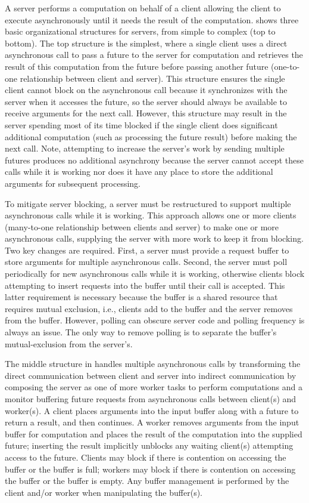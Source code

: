 \documentclass[openright,twoside]{report}
\begin{document}
A server performs a computation on behalf of a client allowing the client to execute asynchronously until it needs the result of the computation.
 shows three basic organizational structures for servers, from simple to complex (top to bottom).
The top structure is the simplest, where a single client uses a direct asynchronous call to pass a future to the server for computation and retrieves the result of this computation from the future before passing another future (one-to-one relationship between client and server).
This structure ensures the single client cannot block on the asynchronous call because it synchronizes with the server when it accesses the future, so the server should always be available to receive arguments for the next call.
However, this structure may result in the server spending most of its time blocked if the single client does significant additional computation (such as processing the future result) before making the next call.
Note, attempting to increase the server's work by sending multiple futures produces no additional asynchrony because the server cannot accept these calls while it is working nor does it have any place to store the additional arguments for subsequent processing.

To mitigate server blocking, a server must be restructured to support multiple asynchronous calls while it is working.
This approach allows one or more clients (many-to-one relationship between clients and server) to make one or more asynchronous calls, supplying the server with more work to keep it from blocking.
Two key changes are required.
First, a server must provide a request buffer to store arguments for multiple asynchronous calls.
Second, the server must poll periodically for new asynchronous calls while it is working, otherwise clients block attempting to insert requests into the buffer until their call is accepted.
This latter requirement is necessary because the buffer is a shared resource that requires mutual exclusion, i.e., clients add to the buffer and the server removes from the buffer.
However, polling can obscure server code and polling frequency is always an issue.
The only way to remove polling is to separate the buffer's mutual-exclusion from the server's.

The middle structure in  handles multiple asynchronous calls by transforming the direct communication between client and server into indirect communication by composing the server as one of more worker tasks to perform computations and a monitor buffering future requests from asynchronous calls between client(s) and worker(s).
A client places arguments into the input buffer along with a future to return a result, and then continues.
A worker removes arguments from the input buffer for computation and places the result of the computation into the supplied future;
inserting the result implicitly unblocks any waiting client(s) attempting access to the future.
Clients may block if there is contention on accessing the buffer or the buffer is full;
workers may block if there is contention on accessing the buffer or the buffer is empty.
Any buffer management is performed by the client and/or worker when manipulating the buffer(s).
\end{document}
